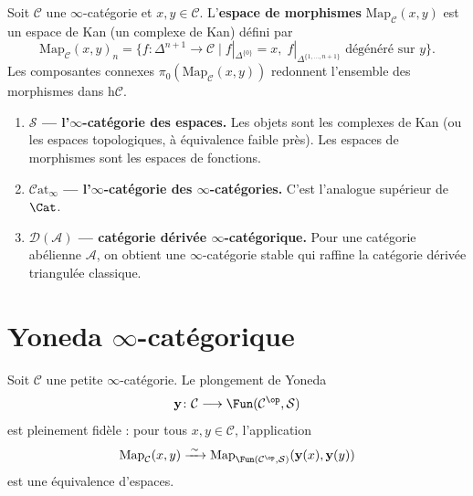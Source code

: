 \begin{definition}\label{def:mapping-space}
Soit $\mathcal{C}$ une $\infty$-catégorie et $x, y \in \mathcal{C}$.
L'\textbf{espace de morphismes} $\mathrm{Map}_\mathcal{C}(x, y)$
est un espace de Kan (un complexe de Kan) défini par
\[
  \mathrm{Map}_\mathcal{C}(x, y)_n
  = \{f \colon \Delta^{n+1} \to \mathcal{C} \mid
      f|_{\Delta^{\{0\}}} = x,\;
      f|_{\Delta^{\{1,\ldots,n+1\}}} \text{ dégénéré sur } y\}.
\]
Les composantes connexes $\pi_0(\mathrm{Map}_\mathcal{C}(x,y))$
redonnent l'ensemble des morphismes dans $\mathrm{h}\mathcal{C}$.
\end{definition}

\begin{exemple}\label{ex:infty-cats}
\begin{enumerate}[label=(\roman*)]
\item \textbf{$\mathcal{S}$ --- l'$\infty$-catégorie des espaces.}
      Les objets sont les complexes de Kan (ou les espaces
      topologiques, à équivalence faible près).  Les espaces de
      morphismes sont les espaces de fonctions.

\item \textbf{$\mathcal{C}\mathrm{at}_\infty$ --- l'$\infty$-catégorie
      des $\infty$-catégories.}
      C'est l'analogue supérieur de $\Cat$.

\item \textbf{$\mathcal{D}(\mathcal{A})$ --- catégorie dérivée
      $\infty$-catégorique.}
      Pour une catégorie abélienne $\mathcal{A}$, on obtient une
      $\infty$-catégorie stable qui raffine la catégorie dérivée
      triangulée classique.
\end{enumerate}
\end{exemple}

\section{Yoneda $\infty$-catégorique}\label{sec:yoneda-infty}

\begin{theoreme}
\label{thm:yoneda-infty}
Soit $\mathcal{C}$ une petite $\infty$-catégorie.  Le plongement
de Yoneda
\[
  \mathbf{y} \colon \mathcal{C} \longrightarrow
  \Fun(\mathcal{C}^\op, \mathcal{S})
\]
est pleinement fidèle : pour tous $x, y \in \mathcal{C}$, l'application
\[
  \mathrm{Map}_\mathcal{C}(x, y)
  \xrightarrow{\;\sim\;}
  \mathrm{Map}_{\Fun(\mathcal{C}^\op, \mathcal{S})}(\mathbf{y}(x), \mathbf{y}(y))
\]
est une équivalence d'espaces.
\end{theoreme}

